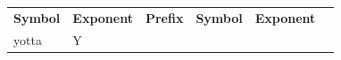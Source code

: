 {\begin{center}
\begin{xtabular*}{\mytablewidth}[t]{|p{10\mystarwidth}|p{10\mystarwidth}|p{10\mystarwidth}|p{10\mystarwidth}|p{10\mystarwidth}|p{10\mystarwidth}|}
    
        
                \textbf{Symbol}
               &
    
    
        
                \textbf{Exponent}
               &
    
    
        
                \textbf{Prefix}
               &
    
    
        
                \textbf{Symbol}
               &
    
    
        
                \textbf{Exponent}
     \tabularnewline{}
    
    
        yotta &
    
    
        Y &
    
    

\end{xtabular*}
\end{center}}

